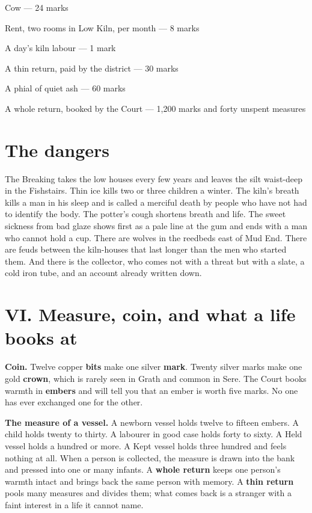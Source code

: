 \documentclass{design/chronicle}
\begin{document}
Cow — 24 marks\par

Rent, two rooms in Low Kiln, per month — 8 marks\par

A day’s kiln labour — 1 mark\par

A thin return, paid by the district — 30 marks\par

A phial of quiet ash — 60 marks\par

A whole return, booked by the Court — 1,200 marks and forty unspent measures\par

\section*{The dangers}

The Breaking takes the low houses every few years and leaves the silt waist-deep in the Fishstairs. Thin ice kills two or three children a winter. The kiln’s breath kills a man in his sleep and is called a merciful death by people who have not had to identify the body. The potter’s cough shortens breath and life. The sweet sickness from bad glaze shows first as a pale line at the gum and ends with a man who cannot hold a cup. There are wolves in the reedbeds east of Mud End. There are feuds between the kiln-houses that last longer than the men who started them. And there is the collector, who comes not with a threat but with a slate, a cold iron tube, and an account already written down.

\CRrule

\section*{VI. Measure, coin, and what a life books at}

\textbf{Coin.} Twelve copper \textbf{bits} make one silver \textbf{mark}. Twenty silver marks make one gold \textbf{crown}, which is rarely seen in Grath and common in Sere. The Court books warmth in \textbf{embers} and will tell you that an ember is worth five marks. No one has ever exchanged one for the other.

\textbf{The measure of a vessel.} A newborn vessel holds twelve to fifteen embers. A child holds twenty to thirty. A labourer in good case holds forty to sixty. A Held vessel holds a hundred or more. A Kept vessel holds three hundred and feels nothing at all. When a person is collected, the measure is drawn into the bank and pressed into one or many infants. A \textbf{whole return} keeps one person’s warmth intact and brings back the same person with memory. A \textbf{thin return} pools many measures and divides them; what comes back is a stranger with a faint interest in a life it cannot name.
\end{document}
